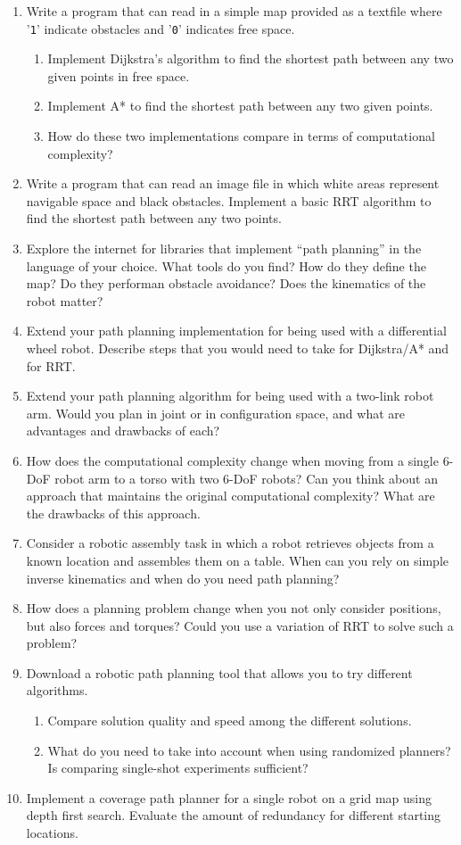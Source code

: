 \begin{enumerate}
\item Write a program that can read in a simple map provided as a textfile where '\texttt{1}' indicate obstacles and '\texttt{0}' indicates free space.
\begin{enumerate}
\item Implement Dijkstra's algorithm to find the shortest path between any two given points in free space.
\item Implement A* to find the shortest path between any two given points.
\item How do these two implementations compare in terms of computational complexity?
\end{enumerate}
\item Write a program that can read an image file in which white areas represent navigable space and black obstacles. Implement a basic RRT algorithm to find the shortest path between any two points.
\item Explore the internet for libraries that implement ``path planning'' in the language of your choice. What tools do you find? How do they define the map? Do they performan obstacle avoidance? Does the kinematics of the robot matter?
\item Extend your path planning implementation for being used with a differential wheel robot. Describe steps that you would need to take for Dijkstra/A* and for RRT.
\item Extend your path planning algorithm for being used with a two-link robot arm. Would you plan in joint or in configuration space, and what are advantages and drawbacks of each?
\item How does the computational complexity change when moving from a single 6-DoF robot arm to a torso with two 6-DoF robots? Can you think about an approach that maintains the original computational complexity? What are the drawbacks of this approach.
\item Consider a robotic assembly task in which a robot retrieves objects from a known location and assembles them on a table. When can you rely on simple inverse kinematics and when do you need path planning?
\item How does a planning problem change when you not only consider positions, but also forces and torques? Could you use  a variation of RRT to solve such a problem?
\item Download a robotic path planning tool that allows you to try different algorithms.
\begin{enumerate}
\item Compare solution quality and speed among the different solutions.
\item What do you need to take into account when using randomized planners? Is comparing single-shot experiments sufficient?
\end{enumerate}
\item Implement a coverage path planner for a single robot on a grid map using depth first search. Evaluate the amount of redundancy for different starting locations. 
\end{enumerate}

\normalsize
